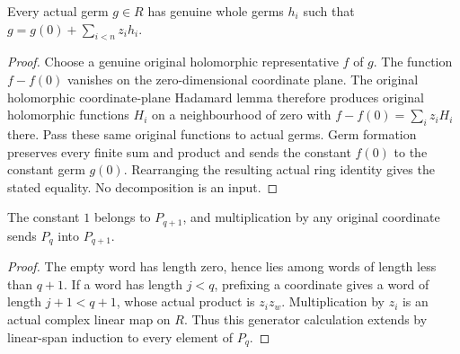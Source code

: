 \begin{lemma}
\label{hir:actual-whole-germ-hadamard-decomposition}
\leanok
{}
Every actual germ $g\in R$ has genuine whole germs $h_i$ such that
$g=g(0)+\sum_{i<n}z_i h_i$.
\end{lemma}
\begin{proof}
Choose a genuine original holomorphic representative $f$ of $g$.
The function $f-f(0)$ vanishes on the zero-dimensional coordinate plane.
The original holomorphic coordinate-plane Hadamard lemma therefore produces
original holomorphic functions $H_i$ on a neighbourhood of zero with
$f-f(0)=\sum_i z_iH_i$ there. Pass these same original functions to actual
germs. Germ formation preserves every finite sum and product and sends the
constant $f(0)$ to the constant germ $g(0)$. Rearranging the resulting actual
ring identity gives the stated equality. No decomposition is an input.
\end{proof}

\begin{lemma}
\label{hir:actual-coordinate-word-span-step}
\leanok
{}
The constant $1$ belongs to $P_{q+1}$, and multiplication by any original
coordinate sends $P_q$ into $P_{q+1}$.
\end{lemma}
\begin{proof}
The empty word has length zero, hence lies among words of length less than
$q+1$. If a word has length $j<q$, prefixing a coordinate gives a word of
length $j+1<q+1$, whose actual product is $z_i z_w$. Multiplication by $z_i$
is an actual complex linear map on $R$. Thus this generator calculation
extends by linear-span induction to every element of $P_q$.
\end{proof}

